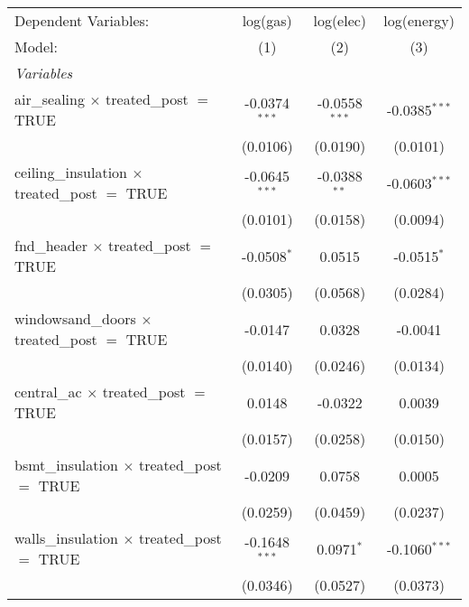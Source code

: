 \begingroup
\centering
\begin{tabular}{lccc}
   \tabularnewline \midrule \midrule
   Dependent Variables:                                      & log(gas)        & log(elec)       & log(energy)\\  
   Model:                                                    & (1)             & (2)             & (3)\\  
   \midrule
   \emph{Variables}\\
   air\_sealing $\times$ treated\_post $=$ TRUE              & -0.0374$^{***}$ & -0.0558$^{***}$ & -0.0385$^{***}$\\   
                                                             & (0.0106)        & (0.0190)        & (0.0101)\\   
   ceiling\_insulation $\times$ treated\_post $=$ TRUE       & -0.0645$^{***}$ & -0.0388$^{**}$  & -0.0603$^{***}$\\   
                                                             & (0.0101)        & (0.0158)        & (0.0094)\\   
   fnd\_header $\times$ treated\_post $=$ TRUE               & -0.0508$^{*}$   & 0.0515          & -0.0515$^{*}$\\   
                                                             & (0.0305)        & (0.0568)        & (0.0284)\\   
   windowsand\_doors $\times$ treated\_post $=$ TRUE         & -0.0147         & 0.0328          & -0.0041\\   
                                                             & (0.0140)        & (0.0246)        & (0.0134)\\   
   central\_ac $\times$ treated\_post $=$ TRUE               & 0.0148          & -0.0322         & 0.0039\\   
                                                             & (0.0157)        & (0.0258)        & (0.0150)\\   
   bsmt\_insulation $\times$ treated\_post $=$ TRUE          & -0.0209         & 0.0758          & 0.0005\\   
                                                             & (0.0259)        & (0.0459)        & (0.0237)\\   
   walls\_insulation $\times$ treated\_post $=$ TRUE         & -0.1648$^{***}$ & 0.0971$^{*}$    & -0.1060$^{***}$\\   
                                                             & (0.0346)        & (0.0527)        & (0.0373)\\   

\end{tabular}
